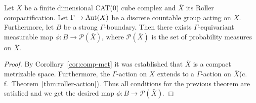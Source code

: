 \begin{cor}
  \label{cor:p(x)}
  Let \(X\) be a finite dimensional CAT(0) cube complex and \(\bar X\) its Roller compactification. Let \(\Gamma \to \operatorname{Aut}(X)\) be a discrete countable group acting on \(X\). Furthermore, let \(B\) be a strong \(\Gamma\)-boundary. Then there exists \(\Gamma\)-equivariant measurable map \(\phi\colon B \to \mathcal{P}(\bar X)\), where \(\mathcal{P}(\bar X)\) is the set of probability measures on \(\bar X\).
\end{cor}

\begin{proof}
  By Corollary~\ref{cor:comp-met} it was established that \(\bar X\) is a compact metrizable space. Furthermore, the \(\Gamma\)-action on \(X\) extends to a \(\Gamma\)-action on \(\bar X\)(c.\,f.\ Theorem~\ref{thm:roller-action}). Thus all conditions for the previous theorem are satisfied and we get the desired map \(\phi\colon B \to \mathcal{P}(\bar X)\).
\end{proof}

